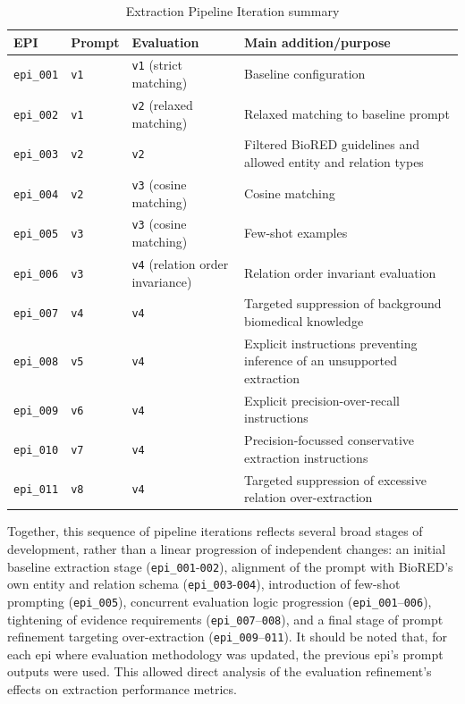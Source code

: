 \begin{table}[H]
    \centering
    \caption{Extraction Pipeline Iteration summary}
    \label{tab:epi_summary}
    \begin{tabularx}{\textwidth}{@{} l p{2.4cm} p{4.0cm} X @{}}
        \toprule
        EPI & Prompt & Evaluation & Main addition/purpose \\
        \midrule
        \texttt{epi\_001} & \texttt{v1} & \texttt{v1} (strict matching) & Baseline configuration \\
        \texttt{epi\_002} & \texttt{v1} & \texttt{v2} (relaxed matching) & Relaxed matching to baseline prompt \\
        \texttt{epi\_003} & \texttt{v2} & \texttt{v2} & Filtered BioRED guidelines and allowed entity and relation types \\
        \texttt{epi\_004} & \texttt{v2} & \texttt{v3} (cosine matching) & Cosine matching \\
        \texttt{epi\_005} & \texttt{v3} & \texttt{v3} (cosine matching) & Few-shot examples \\
        \texttt{epi\_006} & \texttt{v3} & \texttt{v4} (relation order invariance) & Relation order invariant evaluation \\
        \texttt{epi\_007} & \texttt{v4} & \texttt{v4} & Targeted suppression of background biomedical knowledge \\
        \texttt{epi\_008} & \texttt{v5} & \texttt{v4} & Explicit instructions preventing inference of an unsupported extraction \\
        \texttt{epi\_009} & \texttt{v6} & \texttt{v4} & Explicit precision-over-recall instructions \\
        \texttt{epi\_010} & \texttt{v7} & \texttt{v4} & Precision-focussed conservative extraction instructions \\
        \texttt{epi\_011} & \texttt{v8} & \texttt{v4} & Targeted suppression of excessive relation over-extraction \\
        \bottomrule
    \end{tabularx}
\end{table}

Together, this sequence of pipeline iterations reflects several broad stages of development, rather than a linear progression of independent changes: an initial baseline extraction stage (\texttt{epi\_001}-\texttt{002}), alignment of the prompt with BioRED's own entity and relation schema (\texttt{epi\_003}-\texttt{004}), introduction of few-shot prompting (\texttt{epi\_005}), concurrent evaluation logic progression (\texttt{epi\_001}--\texttt{006}), tightening of evidence requirements (\texttt{epi\_007}--\texttt{008}), and a final stage of prompt refinement targeting over-extraction (\texttt{epi\_009}--\texttt{011}). It should be noted that, for each \gls{epi} where evaluation methodology was updated, the previous \gls{epi}'s prompt outputs were used. This allowed direct analysis of the evaluation refinement's effects on extraction performance metrics.

